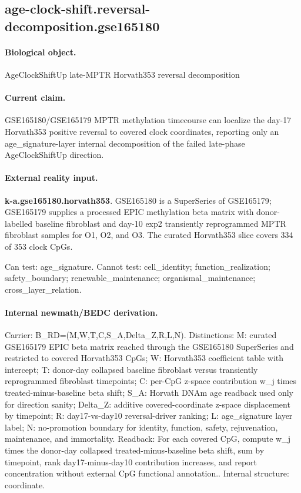 \subsection{age-clock-shift.reversal-decomposition.gse165180}

\paragraph{Biological object.} AgeClockShiftUp late-MPTR Horvath353 reversal decomposition

\paragraph{Current claim.} GSE165180/GSE165179 MPTR methylation timecourse can localize the day-17 Horvath353 positive reversal to covered clock coordinates, reporting only an age\_signature-layer internal decomposition of the failed late-phase AgeClockShiftUp direction.

\paragraph{External reality input.}
\textbf{k-a.gse165180.horvath353}. GSE165180 is a SuperSeries of GSE165179; GSE165179 supplies a processed EPIC methylation beta matrix with donor-labelled baseline fibroblast and day-10 exp2 transiently reprogrammed MPTR fibroblast samples for O1, O2, and O3. The curated Horvath353 slice covers 334 of 353 clock CpGs.

Can test: age\_signature. Cannot test: cell\_identity; function\_realization; safety\_boundary; renewable\_maintenance; organismal\_maintenance; cross\_layer\_relation.

\paragraph{Internal newmath/BEDC derivation.} Carrier: B\_RD=(M,W,T,C,S\_A,Delta\_Z,R,L,N). Distinctions: M: curated GSE165179 EPIC beta matrix reached through the GSE165180 SuperSeries and restricted to covered Horvath353 CpGs; W: Horvath353 coefficient table with intercept; T: donor-day collapsed baseline fibroblast versus transiently reprogrammed fibroblast timepoints; C: per-CpG z-space contribution w\_j times treated-minus-baseline beta shift; S\_A: Horvath DNAm age readback used only for direction sanity; Delta\_Z: additive covered-coordinate z-space displacement by timepoint; R: day17-vs-day10 reversal-driver ranking; L: age\_signature layer label; N: no-promotion boundary for identity, function, safety, rejuvenation, maintenance, and immortality. Readback: For each covered CpG, compute w\_j times the donor-day collapsed treated-minus-baseline beta shift, sum by timepoint, rank day17-minus-day10 contribution increases, and report concentration without external CpG functional annotation.. Internal structure: coordinate.

